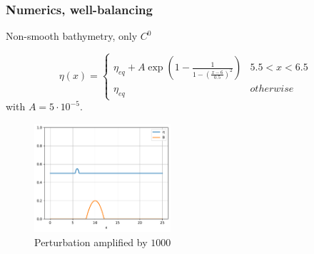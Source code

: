 \documentclass[pt12]{beamer}
\begin{document}
\begin{frame}
\frametitle{Numerics, well-balancing}
Non-smooth bathymetry, only $C^0$

$$\eta(x)=\begin{cases}
\eta_{eq}+A\exp{\left(1-\frac{1}{1-\left(\frac{x-6}{0.5}\right)^2}\right)} & 5.5<x<6.5\\
\eta_{eq} & otherwise
\end{cases}$$
with $A=5\cdot 10^{-5}$.

\begin{figure}
         \centering
         \includegraphics[width=0.45\textwidth]{figures/lakeatrest/alb_latr_pert_IC.pdf}
         \caption{Perturbation amplified by $1000$}
\end{figure}


\end{frame}
\end{document}
